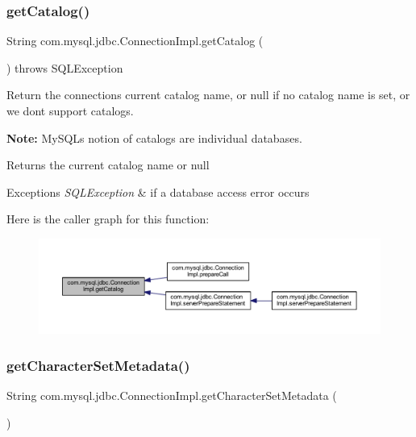 \subsubsection{\texorpdfstring{get\+Catalog()}{getCatalog()}}
{\footnotesize\ttfamily String com.\+mysql.\+jdbc.\+Connection\+Impl.\+get\+Catalog (\begin{DoxyParamCaption}{ }\end{DoxyParamCaption}) throws S\+Q\+L\+Exception}

Return the connections current catalog name, or null if no catalog name is set, or we dont support catalogs. 

{\bfseries Note\+:} My\+S\+QL\textquotesingle{}s notion of catalogs are individual databases. 

\begin{DoxyReturn}{Returns}
the current catalog name or null 
\end{DoxyReturn}

\begin{DoxyExceptions}{Exceptions}
{\em S\+Q\+L\+Exception} & if a database access error occurs \\
\hline
\end{DoxyExceptions}
Here is the caller graph for this function\+:\nopagebreak
\begin{figure}[H]
\begin{center}
\leavevmode
\includegraphics[width=350pt]{classcom_1_1mysql_1_1jdbc_1_1_connection_impl_a200118367aa1d33fe239bc8dcf5457dd_icgraph}
\end{center}
\end{figure}
\mbox{\label{classcom_1_1mysql_1_1jdbc_1_1_connection_impl_a92234918e0a6b565165c92bc467d3b54}} 
\subsubsection{\texorpdfstring{get\+Character\+Set\+Metadata()}{getCharacterSetMetadata()}}
{\footnotesize\ttfamily String com.\+mysql.\+jdbc.\+Connection\+Impl.\+get\+Character\+Set\+Metadata (\begin{DoxyParamCaption}{ }\end{DoxyParamCaption})}


